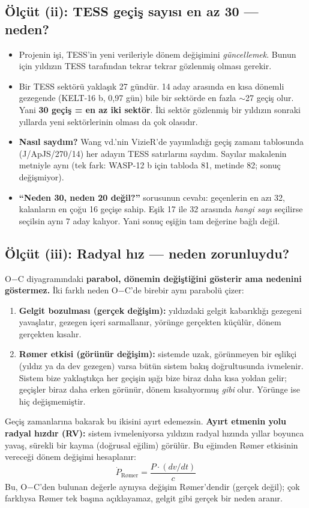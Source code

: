 \documentclass[11pt,a4paper]{article}
\newcounter{sor}[section]
\newcommand{\OC}{O$-$C}
\begin{document}
\subsection{Ölçüt (ii): TESS geçiş sayısı en az 30 — neden?}
\begin{itemize}
\item Projenin işi, TESS'in yeni verileriyle dönem değişimini \emph{güncellemek}. Bunun için yıldızın TESS tarafından tekrar tekrar gözlenmiş olması gerekir.
\item Bir TESS sektörü yaklaşık 27 gündür. 14 aday arasında en kısa dönemli gezegende (KELT-16 b, 0,97 gün) bile bir sektörde en fazla $\sim$27 geçiş olur. Yani \textbf{30 geçiş = en az iki sektör}. İki sektör gözlenmiş bir yıldızın sonraki yıllarda yeni sektörlerinin olması da çok olasıdır.
\item \textbf{Nasıl saydım?} Wang vd.'nin VizieR'de yayımladığı geçiş zamanı tablosunda (J/ApJS/270/14) her adayın TESS satırlarını saydım. Sayılar makalenin metniyle aynı (tek fark: WASP-12 b için tabloda 81, metinde 82; sonuç değişmiyor).
\item \textbf{``Neden 30, neden 20 değil?''} sorusunun cevabı: geçenlerin en azı 32, kalanların en çoğu 16 geçişe sahip. Eşik 17 ile 32 arasında \emph{hangi sayı} seçilirse seçilsin aynı 7 aday kalıyor. Yani sonuç eşiğin tam değerine bağlı değil.
\end{itemize}

\subsection{Ölçüt (iii): Radyal hız — neden zorunluydu?}

\begin{dikkat}
\OC{} diyagramındaki \textbf{parabol, dönemin değiştiğini gösterir ama nedenini göstermez.} İki farklı neden \OC{}'de birebir aynı parabolü çizer:
\begin{enumerate}
\item \textbf{Gelgit bozulması (gerçek değişim):} yıldızdaki gelgit kabarıklığı gezegeni yavaşlatır, gezegen içeri sarmallanır, yörünge gerçekten küçülür, dönem gerçekten kısalır.
\item \textbf{Rømer etkisi (görünür değişim):} sistemde uzak, görünmeyen bir eşlikçi (yıldız ya da dev gezegen) varsa bütün sistem bakış doğrultusunda ivmelenir. Sistem bize yaklaştıkça her geçişin ışığı bize biraz daha kısa yoldan gelir; geçişler biraz daha erken görünür, dönem kısalıyormuş \emph{gibi} olur. Yörünge ise hiç değişmemiştir.
\end{enumerate}
Geçiş zamanlarına bakarak bu ikisini ayırt edemezsin. \textbf{Ayırt etmenin yolu radyal hızdır (RV):} sistem ivmeleniyorsa yıldızın radyal hızında yıllar boyunca yavaş, sürekli bir kayma (doğrusal eğilim) görülür. Bu eğimden Rømer etkisinin vereceği dönem değişimi hesaplanır:
\[ \dot{P}_\text{Rømer} = \frac{P \cdot (dv/dt)}{c} \]
Bu, \OC{}'den bulunan değerle aynıysa değişim Rømer'dendir (gerçek değil); çok farklıysa Rømer tek başına açıklayamaz, gelgit gibi gerçek bir neden aranır.
\end{dikkat}
\end{document}

